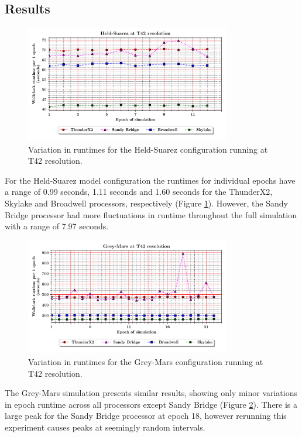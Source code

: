 \documentclass[a4paper,11pt]{report}
\begin{document}
\subsection{Results}
\begin{figure}[htbp]
\begin{center}
\includegraphics[width=0.8\textwidth]{img/held_suarez-variation.pdf}
\caption{Variation in runtimes for the Held-Suarez configuration running at T42 resolution.}
\label{fig:variation-comparison-held-t42}
\end{center}
\end{figure}
For the Held-Suarez model configuration the runtimes for individual epochs have a range of 0.99 seconds, 1.11 seconds and 1.60 seconds for the ThunderX2, Skylake and Broadwell processors, respectively (Figure \ref{fig:variation-comparison-held-t42}). However, the Sandy Bridge processor had more fluctuations in runtime throughout the full simulation with a range of 7.97 seconds.
\begin{figure}[htbp]
\begin{center}
\includegraphics[width=0.8\textwidth]{img/grey_mars-variation.pdf}
\caption{Variation in runtimes for the Grey-Mars configuration running at T42 resolution.}
\label{fig:variation-comparison-mars-t42}
\end{center}
\end{figure}
\par
The Grey-Mars simulation presents similar results, showing only minor variations in epoch runtime across all processors except Sandy Bridge (Figure \ref{fig:variation-comparison-mars-t42}). There is a large peak for the Sandy Bridge processor at epoch 18, however rerunning this experiment causes peaks at seemingly random intervals.
\end{document}
